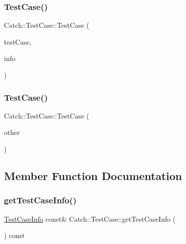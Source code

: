 \subsubsection{\texorpdfstring{Test\+Case()}{TestCase()}\hspace{0.1cm}{\footnotesize\ttfamily [1/2]}}
{\footnotesize\ttfamily Catch\+::\+Test\+Case\+::\+Test\+Case (\begin{DoxyParamCaption}\item[{\hyperlink{struct_catch_1_1_i_test_case}{I\+Test\+Case} $\ast$}]{test\+Case,  }\item[{\hyperlink{struct_catch_1_1_test_case_info}{Test\+Case\+Info} const \&}]{info }\end{DoxyParamCaption})}

\mbox{\label{class_catch_1_1_test_case_ac0011d3789edc3e44edb41f13c4775a0}} 
\subsubsection{\texorpdfstring{Test\+Case()}{TestCase()}\hspace{0.1cm}{\footnotesize\ttfamily [2/2]}}
{\footnotesize\ttfamily Catch\+::\+Test\+Case\+::\+Test\+Case (\begin{DoxyParamCaption}\item[{\hyperlink{class_catch_1_1_test_case}{Test\+Case} const \&}]{other }\end{DoxyParamCaption})}



\subsection{Member Function Documentation}
\mbox{\label{class_catch_1_1_test_case_a1ea0d79f49156cebea076fe1ba50d2b6}} 
\subsubsection{\texorpdfstring{get\+Test\+Case\+Info()}{getTestCaseInfo()}}
{\footnotesize\ttfamily \hyperlink{struct_catch_1_1_test_case_info}{Test\+Case\+Info} const\& Catch\+::\+Test\+Case\+::get\+Test\+Case\+Info (\begin{DoxyParamCaption}{ }\end{DoxyParamCaption}) const}

